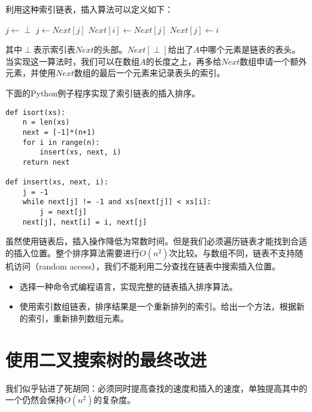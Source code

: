 \documentclass{ctexart}
\begin{document}
利用这种索引链表，插入算法可以定义如下：

\begin{algorithmic}[1]
  \State $j \gets \perp$
    \State $j \gets Next[j]$
  \EndWhile
  \State $Next[i] \gets Next[j]$
  \State $Next[j] \gets i$
\EndFunction
\end{algorithmic}

其中$\perp$表示索引表$Next$的头部。$Next[\perp]$给出了$A$中哪个元素是链表的表头。当实现这一算法时，我们可以在数组$A$的长度之上，再多给$Next$数组申请一个额外元素，并使用$Next$数组的最后一个元素来记录表头的索引。

下面的Python例子程序实现了索引链表的插入排序。

\lstset{language=Python}
\begin{lstlisting}
def isort(xs):
    n = len(xs)
    next = [-1]*(n+1)
    for i in range(n):
        insert(xs, next, i)
    return next

def insert(xs, next, i):
    j = -1
    while next[j] != -1 and xs[next[j]] < xs[i]:
        j = next[j]
    next[j], next[i] = i, next[j]
\end{lstlisting}

虽然使用链表后，插入操作降低为常数时间。但是我们必须遍历链表才能找到合适的插入位置。整个排序算法需要进行$O(n^2)$次比较。与数组不同，链表不支持随机访问（random access），我们不能利用二分查找在链表中搜索插入位置。

\begin{Exercise}
\begin{itemize}
\item 选择一种命令式编程语言，实现完整的链表插入排序算法。
\item 使用索引数组链表，排序结果是一个重新排列的索引。给出一个方法，根据新的索引，重新排列数组元素。
\end{itemize}
\end{Exercise}


\section{使用二叉搜索树的最终改进}

我们似乎钻进了死胡同：必须同时提高查找的速度和插入的速度，单独提高其中的一个仍然会保持$O(n^2)$的复杂度。
\end{document}
